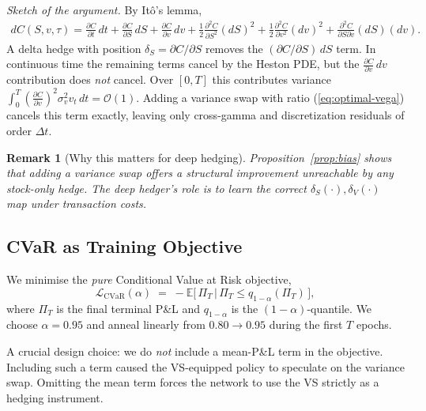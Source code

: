 \documentclass[11pt, a4paper]{article}
\newtheorem{remark}{Remark}
\begin{document}
\emph{Sketch of the argument.}
By It\^o's lemma,
\begin{multline}
    dC(S,v,\tau) = \frac{\partial C}{\partial t}\,dt
    + \frac{\partial C}{\partial S}\, dS + \frac{\partial C}{\partial v}\, dv
    + \tfrac{1}{2}\frac{\partial^2 C}{\partial S^2}(dS)^2
    + \tfrac{1}{2}\frac{\partial^2 C}{\partial v^2}(dv)^2
    + \frac{\partial^2 C}{\partial S\partial v}(dS)(dv).
\end{multline}
A delta hedge with position $\delta_S = \partial C/\partial S$ removes the
$(\partial C/\partial S)\, dS$ term. In continuous time the remaining terms cancel
by the Heston PDE, but the $\frac{\partial C}{\partial v}\, dv$ contribution
does \emph{not} cancel. Over $[0,T]$ this contributes variance
$\int_0^T \left(\frac{\partial C}{\partial v}\right)^2 \sigma_v^2 v_t\, dt = \mathcal{O}(1)$.
Adding a variance swap with ratio (\ref{eq:optimal-vega}) cancels this term exactly,
leaving only cross-gamma and discretization residuals of order $\Delta t$.

\begin{remark}[Why this matters for deep hedging]
Proposition~\ref{prop:bias} shows that adding a variance swap offers a
\emph{structural} improvement unreachable by any stock-only hedge. The deep
hedger's role is to \emph{learn} the correct $\delta_S(\cdot),\delta_V(\cdot)$
map under transaction costs.
\end{remark}

\subsection{CVaR as Training Objective}
\label{sec:cvar-obj}

We minimise the \emph{pure} Conditional Value at Risk objective,
\begin{equation}
    \mathcal{L}_{\mathrm{CVaR}}(\alpha)
    \;=\; -\mathbb{E}\!\big[\,\Pi_T \,\big|\, \Pi_T \le q_{1-\alpha}(\Pi_T)\,\big],
\end{equation}
where $\Pi_T$ is the final terminal P\&L and $q_{1-\alpha}$ is the
$(1-\alpha)$-quantile. We choose $\alpha=0.95$ and anneal linearly from
$0.80 \rightarrow 0.95$ during the first $T$ epochs.

A crucial design choice: we do \emph{not} include a mean-P\&L term in
the objective. Including such a term caused the VS-equipped policy to
speculate on the variance swap. Omitting the mean term forces the
network to use the VS strictly as a hedging instrument.


\end{document}
